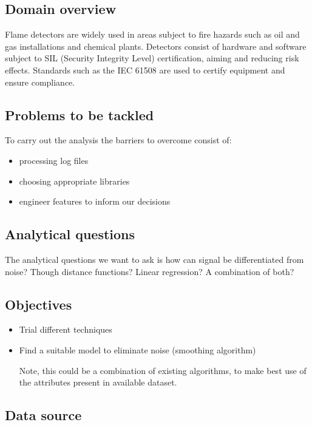 

\subsection{Domain overview}
Flame detectors are widely used in areas subject to fire hazards such as oil and gas installations and chemical plants. Detectors consist of hardware and software subject to SIL (Security Integrity Level) certification, aiming and reducing risk effects. Standards such as the IEC 61508\cite{wiki:IEC61508} are used to certify equipment and ensure compliance.  

\subsection{Problems to be tackled}

To carry out the analysis the barriers to overcome consist of:

\begin{itemize}
\item processing log files
\item choosing appropriate libraries
\item engineer features to inform our decisions

\end{itemize}

\subsection{Analytical questions}

The analytical questions we want to ask is how can signal be differentiated from noise? Though distance functions? Linear regression? A combination of both?

\subsection{Objectives}

\begin{itemize}
\item Trial different techniques
\item Find a suitable model to eliminate noise (smoothing algorithm)

Note, this could be a combination of existing algorithms, to make best use of the attributes present in available dataset.
\end{itemize}

\subsection{Data source} 

